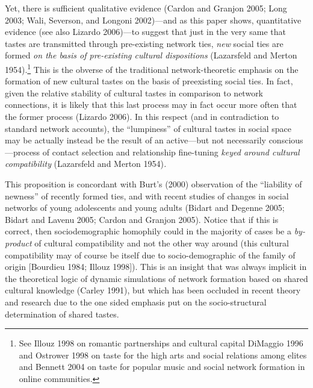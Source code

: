 Yet, there is sufficient qualitative evidence (Cardon and Granjon 2005; Long 2003; Wali, Severson, and Longoni 2002)---and as this paper shows, quantitative evidence (see also Lizardo 2006)---to suggest that just in the very same that tastes are transmitted through pre-existing network ties, \emph{new} social ties are formed \emph{on the basis of pre-existing cultural dispositions} (Lazarsfeld and Merton 1954).\footnote{See Illouz 1998 on romantic partnerships and cultural capital DiMaggio 1996 and Ostrower 1998 on taste for the high arts and social relations among elites and Bennett 2004 on taste for popular music and social network formation in online communities.} This is the obverse of the traditional network-theoretic emphasis on the formation of new cultural tastes on the basis of preexisting social ties. In fact, given the relative stability of cultural tastes in comparison to network connections, it is likely that this last process may in fact occur more often that the former process (Lizardo 2006). In this respect (and in contradiction to standard network accounts), the ``lumpiness'' of cultural tastes in social space may be actually instead be the result of an active---but not necessarily conscious---process of contact selection and relationship fine-tuning \emph{keyed around cultural compatibility} (Lazarsfeld and Merton 1954)\emph{.}

This proposition is concordant with Burt's (2000) observation of the ``liability of newness'' of recently formed ties, and with recent studies of changes in social networks of young adolescents and young adults (Bidart and Degenne 2005; Bidart and Lavenu 2005; Cardon and Granjon 2005). Notice that if this is correct, then sociodemographic homophily could in the majority of cases be a \emph{by-product} of cultural compatibility and not the other way around (this cultural compatibility may of course be itself due to socio-demographic of the family of origin {[}Bourdieu 1984; Illouz 1998{]}). This is an insight that was always implicit in the theoretical logic of dynamic simulations of network formation based on shared cultural knowledge (Carley 1991), but which has been occluded in recent theory and research due to the one sided emphasis put on the socio-structural determination of shared tastes.

